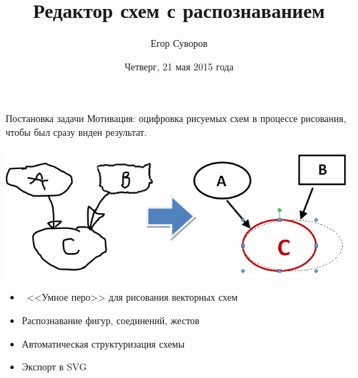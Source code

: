 \documentclass[utf8,xcolor=table]{beamer}
\title{Редактор схем с распознаванием}
\author{Егор Суворов}
\institute[CSCenter]{Практика, осень 2014 -- весна 2015\\Куратор: Евгений Линский}
\date[21.05.2015]{Четверг, 21 мая 2015 года}
\begin{document}
\begin{frame}
\titlepage
\end{frame}

\begin{frame}[t]{Постановка задачи}
  Мотивация: оцифровка рисуемых схем в процессе рисования,
  чтобы был сразу виден результат.

  \includegraphics[width=\textwidth]{problem}
  \begin{itemize}
  \item~<<Умное перо>> для рисования векторных схем
  \item Распознавание фигур, соединений, жестов
  \item Автоматическая структуризация схемы
  \item Экспорт в SVG
  \end{itemize}
\end{frame}
\end{document}
